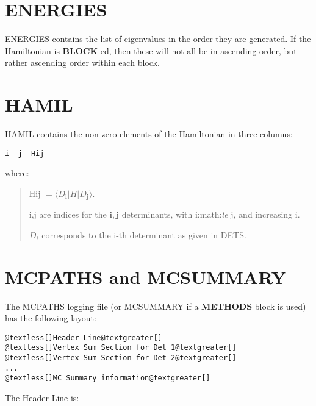 \documentclass[openany,a4paper,10pt,english]{manual}
\newcommand{\bra}{\ensuremath{\langle}}
\newcommand{\ket}{\ensuremath{\rangle}}
\newcommand{\veci}{\ensuremath{\mathbf{i}}}
\newcommand{\vecj}{\ensuremath{\mathbf{j}}}
\begin{document}
\resetcurrentobjects
\hypertarget{--doc-output/energies}{}

\hypertarget{output-energies}{}\section{ENERGIES}

ENERGIES contains the list of eigenvalues in the order they are generated.  If the
Hamiltonian is \textbf{BLOCK} ed, then these will not all be in ascending order, but
rather ascending order within each block.

\resetcurrentobjects
\hypertarget{--doc-output/hamil}{}

\hypertarget{output-hamil}{}\section{HAMIL}

HAMIL contains the non-zero elements of the Hamiltonian in three columns:

\begin{Verbatim}[commandchars=@\[\]]
i  j  Hij
\end{Verbatim}

where:
\begin{quote}

Hij $=\bra D_{\veci} | H | D_{\vecj} \ket$.

i,j are indices for the $\veci,\vecj$ determinants, with i:math:\emph{le}
j, and increasing i.

$D_i$ corresponds to the i-th determinant as given in DETS.
\end{quote}

\resetcurrentobjects
\hypertarget{--doc-output/mcpaths}{}

\hypertarget{output-mcpaths}{}\section{MCPATHS and MCSUMMARY}

The MCPATHS logging file (or MCSUMMARY if a \textbf{METHODS} block is used) has the following layout:

\begin{Verbatim}[commandchars=@\[\]]
@textless[]Header Line@textgreater[]
@textless[]Vertex Sum Section for Det 1@textgreater[]
@textless[]Vertex Sum Section for Det 2@textgreater[]
...
@textless[]MC Summary information@textgreater[]
\end{Verbatim}

The Header Line is:
\end{document}
